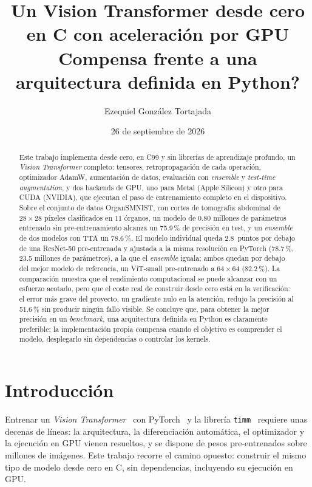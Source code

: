 \documentclass[11pt,a4paper]{article}
\title{Un Vision Transformer desde cero en C con aceleración por GPU\\[0.3em]
       \large \textquestiondown{}Compensa frente a una arquitectura definida en Python?}
\author{Ezequiel González Tortajada}
\date{26 de septiembre de 2026}
\begin{document}
\maketitle

\begin{abstract}
\noindent
Este trabajo implementa desde cero, en C99 y sin librerías de aprendizaje
profundo, un \emph{Vision Transformer} completo: tensores, retropropagación
de cada operación, optimizador AdamW, aumentación de datos,
evaluación con \emph{ensemble} y \emph{test-time augmentation}, y dos backends de
GPU, uno para Metal (Apple Silicon) y otro para CUDA (NVIDIA), que ejecutan el
paso de entrenamiento completo en el dispositivo. Sobre el conjunto de datos
OrganSMNIST, con cortes de tomografía abdominal de $28\times28$ píxeles
clasificados en 11 órganos, un modelo de 0.80 millones de parámetros entrenado
sin pre-entrenamiento alcanza un 75.9\,\%
de precisión en test, y un \emph{ensemble} de dos modelos con TTA un 78.6\,\%.
El modelo individual queda 2.8~puntos por debajo de una ResNet-50 pre-entrenada
y ajustada a la misma resolución en PyTorch (78.7\,\%, 23.5 millones de
parámetros), a la que el \emph{ensemble} iguala; ambos quedan por debajo del
mejor modelo de referencia, un ViT-small pre-entrenado a $64\times64$
(82.2\,\%). La comparación muestra que el
rendimiento computacional se puede alcanzar con un esfuerzo acotado, pero que el
coste real de construir desde cero está en la verificación: el error más grave
del proyecto, un gradiente nulo en la atención, redujo la precisión al
51.6\,\% sin producir ningún fallo visible. Se concluye que, para obtener la
mejor precisión en un \emph{benchmark}, una arquitectura definida en Python es
claramente preferible; la implementación propia compensa cuando el objetivo es
comprender el modelo, desplegarlo sin dependencias o controlar los kernels.
\end{abstract}

\tableofcontents
\newpage

\section{Introducción}

Entrenar un \emph{Vision Transformer}~\cite{vit} con PyTorch~\cite{pytorch} y la
librería \texttt{timm}~\cite{timm} requiere unas decenas de líneas: la
arquitectura, la diferenciación automática, el optimizador y la ejecución en GPU
vienen resueltos, y se dispone de pesos pre-entrenados sobre millones de
imágenes. Este trabajo recorre el camino opuesto: construir el mismo tipo de
modelo desde cero en C, sin dependencias, incluyendo su ejecución en GPU.
\end{document}
